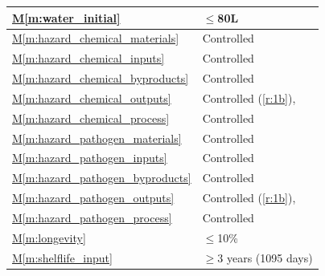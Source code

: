 \documentclass{../tex/report}
\newcommand{\mref}[1]{\hyperref[#1]{M\ref{#1}}}
\begin{document}
\begin{tabular}{|l|p{14.35cm}|}
    \mref{m:water_initial}              & $\le$80L                                                          \hfill \cite{dsfc-phase2}                               \\ \hline
    \mref{m:hazard_chemical_materials}  & Controlled                                                        \hfill \cite{dsfc-phase2}                               \\ \hline
    \mref{m:hazard_chemical_inputs}     & Controlled                                                        \hfill \cite{dsfc-phase2}                               \\ \hline
    \mref{m:hazard_chemical_byproducts} & Controlled                                                        \hfill \cite{dsfc-phase2}                               \\ \hline
    \mref{m:hazard_chemical_outputs}    & Controlled                                                        \hfill (\ref{r:1b}), \cite{dsfc-phase2}                 \\ \hline
    \mref{m:hazard_chemical_process}    & Controlled                                                        \hfill \cite{dsfc-phase2}                               \\ \hline
    \mref{m:hazard_pathogen_materials}  & Controlled                                                        \hfill \cite{dsfc-phase2}                               \\ \hline
    \mref{m:hazard_pathogen_inputs}     & Controlled                                                        \hfill \cite{dsfc-phase2}                               \\ \hline
    \mref{m:hazard_pathogen_byproducts} & Controlled                                                        \hfill \cite{dsfc-phase2}                               \\ \hline
    \mref{m:hazard_pathogen_outputs}    & Controlled                                                        \hfill (\ref{r:1b}), \cite{dsfc-phase2}                 \\ \hline
    \mref{m:hazard_pathogen_process}    & Controlled                                                        \hfill \cite{dsfc-phase2}                               \\ \hline
    \mref{m:longevity}                  & $\le$10\%                                                         \hfill \cite{applicantguide,dsfc-phase2}                \\ \hline
    \mref{m:shelflife_input}            & $\ge$3 years (1095 days)                                          \hfill \cite{applicantguide,dsfc-phase2}                \\ \hline

\end{tabular}
\end{document}

